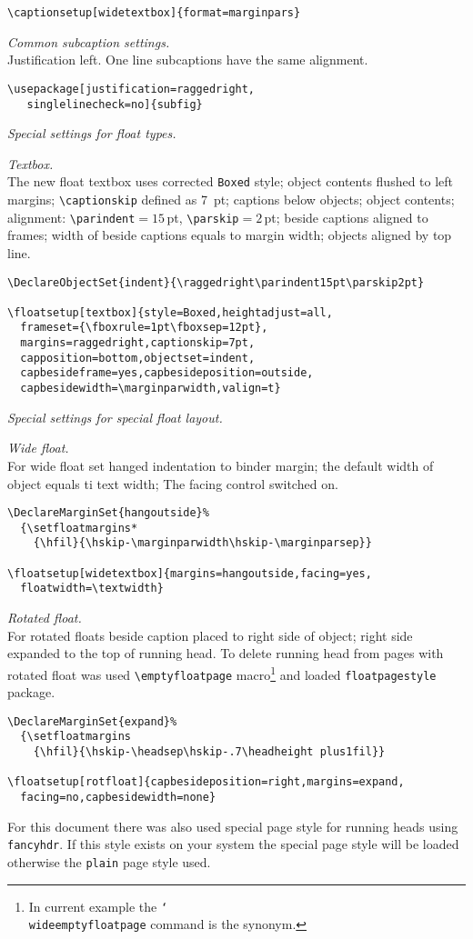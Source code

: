 \documentclass{book}
\providecommand*{\pkg}[1]{\texttt{#1}}
\providecommand*{\com}[1]{\texttt{\char`\\#1}}
\begin{document}
\begin{sl}
\begin{verbatim}
\captionsetup[widetextbox]{format=marginpars}
\end{verbatim}

\emph{Common subcaption settings.}\\
Justification left. One line subcaptions have the same alignment.
\begin{verbatim}
\usepackage[justification=raggedright,
   singlelinecheck=no]{subfig}
\end{verbatim}

\emph{Special settings for float types.}

\emph{Textbox.}\\
The new float textbox uses
corrected \texttt{Boxed} style; object contents flushed to left margins;
\verb|\captionskip| defined as 7~pt;
captions below objects;
object contents; alignment: \verb|\parindent|${{}=15}$\,pt, \verb|\parskip|${{}=2}$\,pt;
beside captions aligned to frames;
width of beside captions equals to margin width;
objects aligned by top line.
\begin{verbatim}
\DeclareObjectSet{indent}{\raggedright\parindent15pt\parskip2pt}

\floatsetup[textbox]{style=Boxed,heightadjust=all,
  frameset={\fboxrule=1pt\fboxsep=12pt},
  margins=raggedright,captionskip=7pt,
  capposition=bottom,objectset=indent,
  capbesideframe=yes,capbesideposition=outside,
  capbesidewidth=\marginparwidth,valign=t}
\end{verbatim}

\emph{Special settings for special float layout.}

\emph{Wide float.}\\
For wide float set hanged indentation to binder margin;
the default width of object equals ti text width;
The facing control switched on.
\begin{verbatim}
\DeclareMarginSet{hangoutside}%
  {\setfloatmargins*
    {\hfil}{\hskip-\marginparwidth\hskip-\marginparsep}}

\floatsetup[widetextbox]{margins=hangoutside,facing=yes,
  floatwidth=\textwidth}
\end{verbatim}

\emph{Rotated float.}\\
For rotated floats beside caption placed to right side of object;
right side expanded to the top of running head. To delete running head from pages
with rotated float was used \verb|\emptyfloatpage| macro\footnote{In current example the
\protect\com{wideemptyfloatpage} command is the synonym.} and
loaded \pkg{floatpagestyle} package.
\begin{verbatim}
\DeclareMarginSet{expand}%
  {\setfloatmargins
    {\hfil}{\hskip-\headsep\hskip-.7\headheight plus1fil}}

\floatsetup[rotfloat]{capbesideposition=right,margins=expand,
  facing=no,capbesidewidth=none}
\end{verbatim}

For this document there was also used special page style for running heads
using \pkg{fancyhdr}. If this style exists on your system the special page
style will be loaded otherwise the \texttt{plain} page style used.
\end{sl}
\end{document}
